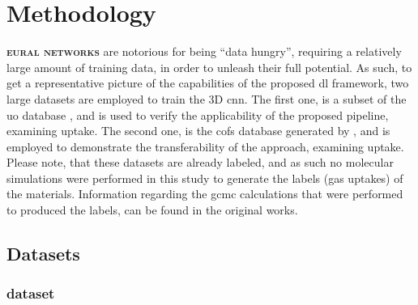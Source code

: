 \chapter{Methodology}

\lettrine[
	nindent=0em, findent=0.5em, loversize=-0.12, lines=5
]{}{\bfseries\color{Blue}eural networks} are
notorious for being ``data hungry'', requiring a relatively large amount of
training data, in order to unleash their full potential. As
such, to get a representative picture of the capabilities of the proposed
\gls{dl} framework, two large datasets are employed to train the
3D \gls{cnn}. The first one, is a subset of the \gls{uo} database \parencite{Boyd_2019}, and is used to verify the applicability of the
proposed pipeline, examining  uptake. The second one, is the \glspl{cof}
database generated by \parencite{Mercado_2018}, and is employed to demonstrate the
transferability of the approach, examining  uptake. Please note, that
these datasets are already labeled, and as such no molecular
simulations were performed in this study to
generate the labels (gas uptakes) of the
materials. Information regarding the \gls{gcmc} calculations that were performed
to produced the labels, can be found in the original works.

\section{Datasets}
\label{sec:datasets}

\subsection{ dataset}

